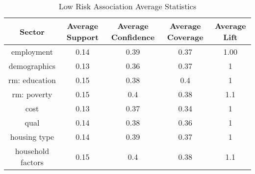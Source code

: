 \begin{table}[h]
    \centering
    \caption{Low Risk Association Average Statistics}
    \label{tab:low_risk_ass} %
    \begin{tabular}{|c|c|c|c|c|}
    \hline
    Sector & Average Support & Average Confidence & Average Coverage & Average Lift \\
    \hline
    employment & 0.14 & 0.39 & 0.37 & 1.00 \\
    demographics & 0.13 & 0.36 & 0.37 & 1 \\
    rm: education & 0.15 & 0.38 & 0.4 & 1 \\
    rm: poverty & 0.15 & 0.4 & 0.38 & 1.1 \\
    cost & 0.13 & 0.37 & 0.34 & 1 \\
    qual & 0.14 & 0.38 & 0.36 & 1 \\
    housing type & 0.14 & 0.39 & 0.37 & 1 \\
    household factors & 0.15 & 0.4 & 0.38 & 1.1 \\
    \hline
    \end{tabular}
\end{table}